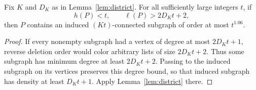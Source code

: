 \begin{corollary}\label{density:list-district}
Fix \(K\) and \(D_K\) as in Lemma~\ref{lem:district}.
For all sufficiently large integers \(t\), if
\[
 h(P)<t,\qquad \ell(P)>2D_Kt+2,
\]
then \(P\) contains an induced \((Kt)\)-connected subgraph of order
at most \(t^{1.06}\).
\end{corollary}

\begin{proof}
If every nonempty subgraph had a vertex of degree at most \(2D_Kt+1\),
reverse deletion order would color arbitrary lists of size \(2D_Kt+2\).
Thus some subgraph has minimum degree at least \(2D_Kt+2\).
Passing to the induced subgraph on its vertices preserves this degree
bound, so that induced subgraph has density at least \(D_Kt+1\).
Apply Lemma~\ref{lem:district} there.
\end{proof}
